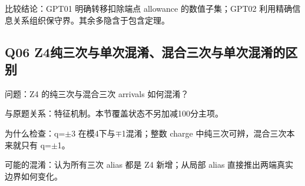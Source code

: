 \documentclass[11pt,a4paper]{article}
\begin{document}
比较结论：GPT01 明确转移扣除端点 allowance 的数值子集；GPT02 利用精确信息关系组织保守界。其余多隐含于包含定理。

\clearpage
\subsection{Q06 Z4纯三次与单次混淆、混合三次与单次混淆的区别}
\label{aspect:Q06}
问题：Z4 的纯三次与混合三次 arrivals 如何混淆？

与原题关系：特征机制。本节覆盖状态不另加减100分主项。

为什么检查：q=\ensuremath{\pm}3 在模4下与\ensuremath{\mp}1混淆；整数 charge 中纯三次可辨，混合三次本来就只有 q=\ensuremath{\pm}1。

可能的混淆：认为所有三次 alias 都是 Z4 新增；从局部 alias 直接推出两端真实边界如何变化。
\end{document}
